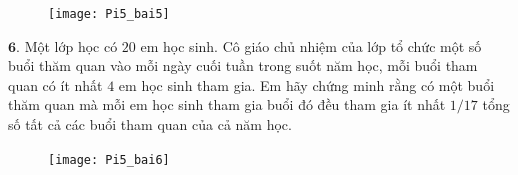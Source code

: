 \begin{multicols}{2}
	\begin{figure}[H]
			\centering
			\vspace*{-5pt}
			\captionsetup{labelformat= empty, justification=centering}
			\texttt{[image: Pi5\_bai5]}
			\vspace*{-15pt}
		\end{figure}
	$\pmb{6.}$ Một lớp học có $20$ em học sinh. Cô giáo chủ nhiệm của lớp tổ chức một số buổi thăm quan vào mỗi ngày cuối tuần trong suốt năm học, mỗi buổi tham quan có ít nhất $4$ em học sinh tham gia. Em hãy chứng minh rằng có một buổi thăm quan mà mỗi em học sinh tham gia buổi đó đều tham gia ít nhất $1/17$ tổng số tất cả các buổi tham quan của cả năm học.
	\begin{figure}[H]
		\centering
		\vspace*{-5pt}
		\captionsetup{labelformat= empty, justification=centering}
		\texttt{[image: Pi5\_bai6]}
		\vspace*{-15pt}
	\end{figure}
\end{multicols}
\newpage
\begingroup
{} 
\centering
\endgroup
\vspace*{55pt}

